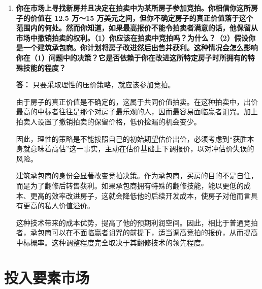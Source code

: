 \begin{enumerate}[label=\textbf{\arabic*.}, leftmargin=*]
		\item \textbf{你在市场上寻找新房并且决定在拍卖中为某所房子参加竞拍。你相信你这所房子的价值在 12.5 万～15 万美元之间，但你不确定房子的真正价值落于这个范围内的何处。然而你知道，如果最高报价不能令拍卖者满意的话，他保留从市场中撤销拍卖的权利。（1）你应该在拍卖中竞拍吗？为什么？（2）假设你是一个建筑承包商。你计划将房子改进然后出售并获利。这种情况会怎么影响你在（1）问题中的决策？它是否依赖于你在改进这所特定房子时所拥有的特殊技能的程度？}
		
		\textbf{答：}
		只要采取理性的压价策略，就应该参加竞拍。
		
		由于房子的真正价值是不确定的，这属于共同价值拍卖。在这种拍卖中，出价最高的中标者往往是那个对房子最乐观的人，因而最容易面临赢者诅咒。加上拍卖人设置了撤销拍卖的保留价格，低价捡漏的机会变少。
		
		因此，理性的策略是不能按照自己的初始期望估价出价，必须考虑到“获胜本身就意味着高估”这一事实，主动在估价基础上下调报价，以对冲估价失误的风险。
		
		建筑承包商的身份会显著改变竞拍决策。作为承包商，买房的目的不是自住，而是为了翻修后转售获利。如果承包商拥有特殊的翻修技能，能以更低的成本、更高的效率改进房子，这就会降低他的后续开发成本，使房子对他而言具有更高的私人价值溢价。
		
		这种技术带来的成本优势，提高了他的预期利润空间。因此，相比于普通竞拍者，承包商可以在不面临赢者诅咒的前提下，适当调高竞拍的报价，从而提高中标概率。这种调整程度完全取决于其翻修技术的领先程度。
		
	\end{enumerate}
	
	\chapter{投入要素市场}
	
